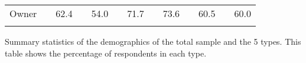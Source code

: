 \begin{table}[]
{\begin{threeparttable}
\begin{tabular}{ll|cccccccccccc}
				\multicolumn{2}{l|}{Owner} &  & 62.4 &  & 54.0 &  & 71.7 &  & 73.6 &  & 60.5 &  & 60.0 \\ 
				& &  &  &  &  &  &  &  &  &  &  &  &  \\ \hline \hline
			\end{tabular}
			\begin{tablenotes}\footnotesize
				\item[] Summary statistics of the demographics of the total sample and the 5 types. This table shows the percentage of respondents in each type.
			\end{tablenotes}
		\end{threeparttable}
	}
\end{table}